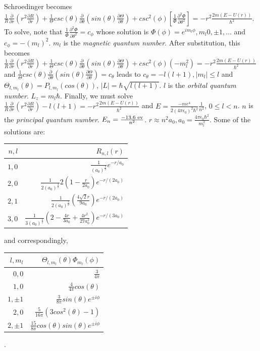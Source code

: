 Schroedinger becomes
${\frac 1 {R}} {\frac {\partial} {\partial r}} (r^2 {\frac {\partial R} {\partial r}}) +
{\frac 1 {\Theta}} csc(\theta) {\frac {\partial} {\partial \theta}} (sin(\theta) 
{\frac {\partial \Theta} {\partial \theta}})+
csc^2(\phi) [ {\frac 1 {\Phi}} {\frac {\partial^2 \Phi} {\partial \theta^2}}] 
= -r^2 {\frac {2m(E-U(r))} {\hbar^2}}$.
To solve, note that
${\frac 1 {\Phi}} {\frac {\partial^2 \Phi} {\partial \theta^2}} = c_{\phi}$ whose solution is
$\Phi(\phi)= e^{i m_l \phi}, m_l 0, \pm 1, \ldots$ and $c_{\phi}= - (m_l)^2$.
$m_l$ is the \emph{magnetic quantum number}.
After substitution, this becomes
${\frac 1 {R}} {\frac {\partial} {\partial r}} (r^2 {\frac {\partial R} {\partial r}}) +
{\frac 1 {\Theta}} csc(\theta) {\frac {\partial} {\partial \theta}} (sin(\theta) 
{\frac {\partial \Theta} {\partial \theta}})+
csc^2(\phi) (-m_l^2) = -r^2 {\frac {2m(E-U(r))} {\hbar^2}}$ and
$ {\frac 1 {\Theta}} csc(\theta) {\frac {\partial} {\partial \theta}} (sin(\theta) 
{\frac {\partial \Theta} {\partial \theta}}) = c_{\theta}$ leads to
$c_{\theta}= -l(l+1), |m_l| \le l$ and
$\Theta_{l, m_l}(\theta) = P_{l, m_l}(cos(\theta))$, $|L|= \hbar \sqrt{l(l+1)}$.
$l$ is the \emph{orbital quantum number}.
$L_z = m_l \hbar$. 
Finally, we must solve
${\frac 1 {R}} {\frac {\partial} {\partial r}} (r^2 {\frac {\partial R} {\partial r}}) - l(l+1)
= -r^2 {\frac {2m(E-U(r))} {\hbar^2}}$  and 
$E= {\frac {-m e^4} {2(4 \pi \epsilon_0)^2 \hbar^2}} {\frac 1 {n^2}}$, $0 \le l < n$.
$n$ is the \emph{principal quantum number}.  $E_n= {\frac {-13.6 \textnormal{ ev}} {n^2}}$.
$r \approx n^2 a_0, a_0 = {\frac {4 \pi \epsilon_0 \hbar^2} {m_l^2}}$.  Some of the solutions
are:
\begin{center}
\begin{tabular} {| r | r |}
\hline
$n, l$ & $R_{n, l}(r)$ \\
\hline
$1,0$ & ${\frac 1 {(a_0)^{\frac 3 2}}} e^{-r/a_0}$ \\
\hline
$2,0$ & ${\frac 1 {2(a_0)^{\frac 3 2}}} 2(1- {\frac r {2 a_0}}) e^{-r/(2a_0)}$ \\
\hline
$2,1$ & ${\frac 1 {2(a_0)^{\frac 3 2}}} ({\frac  {4 \sqrt{2}r} {9 a_0}}) e^{-r/(2a_0)}$ \\
\hline
$3,0$ & ${\frac 1 {3(a_0)^{\frac 3 2}}} (2 - {\frac {4r} {3 a_0}} +
{\frac {4r^2} {27  a_0^2}}) e^{-r/(3a_0)}$ \\
\hline
\end{tabular}
\end{center}
and correspondingly,
\begin{center}
\begin{tabular} {|r r|}
\hline
$l, m_l$ & $\Theta_{l, m_l}(\theta) \Phi_{m_l}(\phi)$ \\
\hline
$0,0$ & ${\frac {3} {4 \pi}}$ \\
\hline
$1,0$ & ${\frac {4} {4 \pi}} cos(\theta)$ \\
\hline
$1,\pm 1$ & ${\frac {3} {8 \pi}} sin(\theta) e^{\pm i \phi}$ \\
\hline
$2,0$ & ${\frac {5} {16 \pi}} (3 cos^2(\theta) -1)$ \\
\hline
$2,\pm 1$ & ${\frac {15} {8 \pi}} cos(\theta) sin(\theta) e^{\pm i \phi}$ \\
\hline
\end{tabular}.
\end{center}
